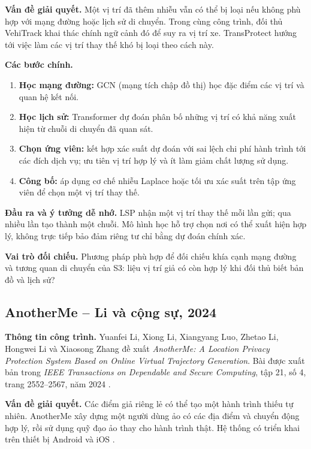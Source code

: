 \documentclass[12pt,a4paper,oneside]{report}
\begin{document}
\noindent\textbf{Vấn đề giải quyết.}
Một vị trí đã thêm nhiễu vẫn có thể bị loại nếu không phù hợp với mạng đường hoặc lịch sử di chuyển. Trong cùng công trình, đối thủ VehiTrack khai thác chính ngữ cảnh đó để suy ra vị trí xe. TransProtect hướng tới việc làm các vị trí thay thế khó bị loại theo cách này.

\noindent\textbf{Các bước chính.}
\begin{enumerate}
  \item \textbf{Học mạng đường:} GCN (mạng tích chập đồ thị) học đặc điểm các vị trí và quan hệ kết nối.
  \item \textbf{Học lịch sử:} Transformer dự đoán phân bố những vị trí có khả năng xuất hiện từ chuỗi di chuyển đã quan sát.
  \item \textbf{Chọn ứng viên:} kết hợp xác suất dự đoán với sai lệch chi phí hành trình tới các đích dịch vụ; ưu tiên vị trí hợp lý và ít làm giảm chất lượng sử dụng.
  \item \textbf{Công bố:} áp dụng cơ chế nhiễu Laplace hoặc tối ưu xác suất trên tập ứng viên để chọn một vị trí thay thế.
\end{enumerate}

\noindent\textbf{Đầu ra và ý tưởng dễ nhớ.}
LSP nhận một vị trí thay thế mỗi lần gửi; qua nhiều lần tạo thành một chuỗi. Mô hình học hỗ trợ chọn nơi có thể xuất hiện hợp lý, không trực tiếp bảo đảm riêng tư chỉ bằng dự đoán chính xác.

\noindent\textbf{Vai trò đối chiếu.}
Phương pháp phù hợp để đối chiếu khía cạnh mạng đường và tương quan di chuyển của S3: liệu vị trí giả có còn hợp lý khi đối thủ biết bản đồ và lịch sử?

\clearpage
\subsection{AnotherMe -- Li và cộng sự, 2024}

\noindent\textbf{Thông tin công trình.}
Yuanfei Li, Xiong Li, Xiangyang Luo, Zhetao Li, Hongwei Li và Xiaosong Zhang đề xuất \emph{AnotherMe: A Location Privacy Protection System Based on Online Virtual Trajectory Generation}. Bài được xuất bản trong \emph{IEEE Transactions on Dependable and Secure Computing}, tập 21, số 4, trang 2552--2567, năm 2024 \citep{li2024anotherme}.

\noindent\textbf{Vấn đề giải quyết.}
Các điểm giả riêng lẻ có thể tạo một hành trình thiếu tự nhiên. AnotherMe xây dựng một người dùng ảo có các địa điểm và chuyển động hợp lý, rồi sử dụng quỹ đạo ảo thay cho hành trình thật. Hệ thống có triển khai trên thiết bị Android và iOS \citep{anothermecode}.
\end{document}
